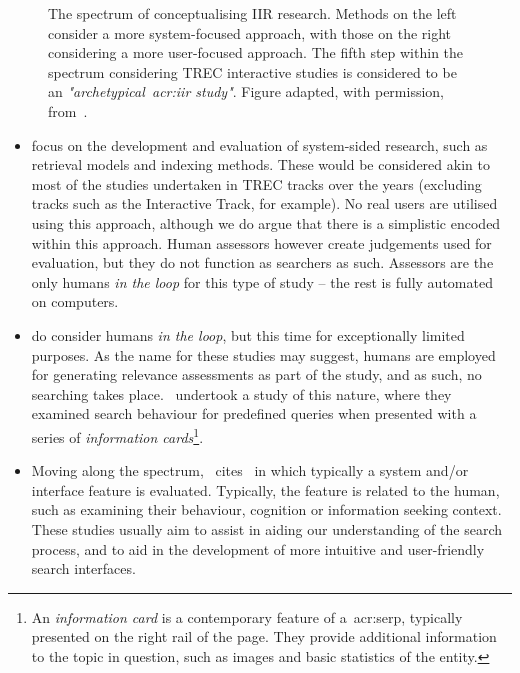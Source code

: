 \begin{figure}[t!]
    \centering
    \caption[Spectrum IIR research~\citep{kelly2009iir}]{The spectrum of conceptualising IIR research. Methods on the left consider a more system-focused approach, with those on the right considering a more user-focused approach. The fifth step within the spectrum considering TREC interactive studies is considered to be an \emph{"archetypical~\gls{acr:iir} study"}. Figure adapted, with permission, from~\cite{kelly2009iir}.}
    \label{fig:spectrum}
\end{figure}

\begin{itemize}
    
    \item[\emph{(1)}]{ focus on the development and evaluation of system-sided research, such as retrieval models and indexing methods. These would be considered akin to most of the studies undertaken in TREC tracks over the years (excluding tracks such as the Interactive Track, for example). No real users are utilised using this approach, although we do argue that there is a simplistic  encoded within this approach. Human assessors however create judgements used for evaluation, but they do not function as searchers as such. Assessors are the only humans \emph{in the loop} for this type of study -- the rest is fully automated on computers.}
    
    \item[\emph{(2)}]{ do consider humans \emph{in the loop}, but this time for exceptionally limited purposes. As the name for these studies may suggest, humans are employed for generating relevance assessments as part of the study, and as such, no searching takes place.~\cite{bota2016information_cards} undertook a study of this nature, where they examined search behaviour for predefined queries when presented with a series of \emph{information cards}\footnote{An \emph{information card} is a contemporary feature of a~\gls{acr:serp}, typically presented on the right rail of the page. They provide additional information to the topic in question, such as images and basic statistics of the entity.}}.
    
    \item[\emph{(5)}]{Moving along the spectrum,~\cite{kelly2009iir} cites~ in which typically a system and/or interface feature is evaluated. Typically, the feature is related to the human, such as examining their behaviour, cognition or information seeking context. These studies usually aim to assist in aiding our understanding of the search process, and to aid in the development of more intuitive and user-friendly search interfaces.}
    
\end{itemize}

